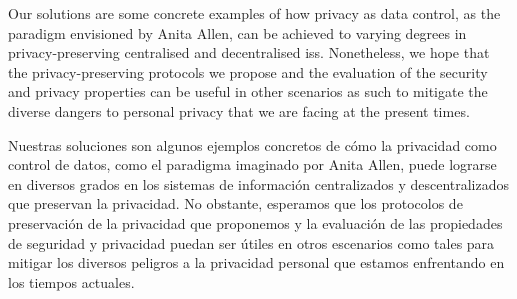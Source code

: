     Our solutions are some concrete examples of how privacy as data control, as 
    the paradigm envisioned by Anita Allen, can be achieved to varying degrees in 
    privacy-preserving centralised and decentralised \aclp*{is}. Nonetheless, we 
    hope that the privacy-preserving protocols we propose and the evaluation of 
    the security and privacy properties can be useful in other scenarios as such 
    to mitigate the diverse dangers to personal privacy that we are facing at the 
    present times.
    
    Nuestras soluciones son algunos ejemplos concretos de cómo la privacidad como 
    control de datos, como el paradigma imaginado por Anita Allen, puede lograrse 
    en diversos grados en los sistemas de información centralizados y descentralizados 
    que preservan la privacidad. No obstante, esperamos que los protocolos de preservación 
    de la privacidad que proponemos y la evaluación de las propiedades de seguridad 
    y privacidad puedan ser útiles en otros escenarios como tales para mitigar los 
    diversos peligros a la privacidad personal que estamos enfrentando en los tiempos 
    actuales.
    